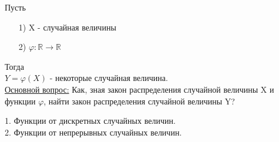 

Пусть 
\begin{enumerate}
	\item[1)] X - случайная величины
	\item[2)] $\varphi: \mathbb{R} \to \mathbb{R}$\\
\end{enumerate}
Тогда\\
$Y = \varphi(X)$ - некоторые случайная величина.\\
\underline{Основной вопрос:} Как, зная закон распределения случайной величины X и функции $\varphi$, найти закон распределения случайной величины Y?



1. Функции от дискретных случайных величин.\\


2. Функции от непрерывных случайных величин.\\
